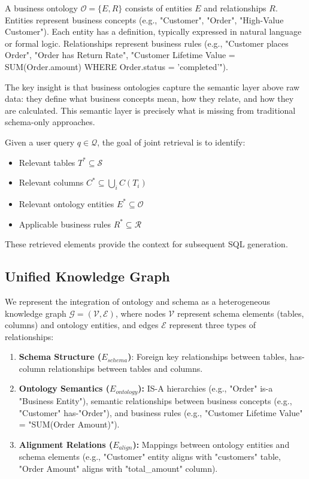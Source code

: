 \documentclass[sigconf, nonatbib]{acmart}
\begin{document}
A business ontology $\mathcal{O} = \{E, R\}$ consists of entities $E$ and relationships $R$. Entities represent business concepts (e.g., "Customer", "Order", "High-Value Customer"). Each entity has a definition, typically expressed in natural language or formal logic. Relationships represent business rules (e.g., "Customer places Order", "Order has Return Rate", "Customer Lifetime Value = SUM(Order.amount) WHERE Order.status = 'completed'").

The key insight is that business ontologies capture the semantic layer above raw data: they define what business concepts mean, how they relate, and how they are calculated. This semantic layer is precisely what is missing from traditional schema-only approaches.

Given a user query $q \in \mathcal{Q}$, the goal of joint retrieval is to identify:
\begin{itemize}
    \item Relevant tables $T^* \subseteq \mathcal{S}$
    \item Relevant columns $C^* \subseteq \bigcup_i C(T_i)$
    \item Relevant ontology entities $E^* \subseteq \mathcal{O}$
    \item Applicable business rules $R^* \subseteq \mathcal{R}$
\end{itemize}

These retrieved elements provide the context for subsequent SQL generation.

\subsection{Unified Knowledge Graph}

We represent the integration of ontology and schema as a heterogeneous knowledge graph $\mathcal{G} = (\mathcal{V}, \mathcal{E})$, where nodes $\mathcal{V}$ represent schema elements (tables, columns) and ontology entities, and edges $\mathcal{E}$ represent three types of relationships:

\begin{enumerate}
    \item \textbf{Schema Structure ($E_{schema}$)}: Foreign key relationships between tables, has-column relationships between tables and columns.
    
    \item \textbf{Ontology Semantics ($E_{ontology}$):} IS-A hierarchies (e.g., "Order" is-a "Business Entity"), semantic relationships between business concepts (e.g., "Customer" has-"Order"), and business rules (e.g., "Customer Lifetime Value" = "SUM(Order Amount)").
    
    \item \textbf{Alignment Relations ($E_{align}$):} Mappings between ontology entities and schema elements (e.g., "Customer" entity aligns with "customers" table, "Order Amount" aligns with "total\_amount" column).
\end{enumerate}
\end{document}
